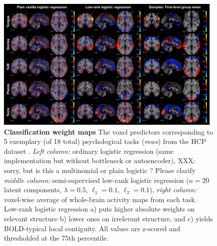 \documentclass{article} %
\begin{document}
\begin{figure}
\begin{centering}
\includegraphics[width=0.98\textwidth]{figures/figure_weights_perc75.png}
\end{centering}
\vspace{-0.1cm}
\caption{\textbf{Classification weight maps}
The voxel predictors corresponding to 5 exemplary
(of 18 total) psychological tasks (\textit{rows})
from the HCP dataset \cite{barch2013}.
\textit{Left column:} ordinary logistic regression (same
implementation but without bottleneck or autoencoder),
XXX: sorry, but is this a multinomial or plain logistic ? Please clarify 
\textit{middle column:} semi-supervised low-rank logistic regression
($n=20$ latent components, $\lambda=0.5$, $\ell_1=0.1$, $\ell_2=0.1$),
\textit{right column:} voxel-wise average of whole-brain
activity maps from each task.
Low-rank logistic regression
a) puts higher absolute weights on relevant structure
b) lower ones on irrelevant structure,
and
c) yields BOLD-typical local contiguity.
All values are z-scored and thresholded at the 75th percentile.
}
\label{fig_weights}
\end{figure}
\end{document}
